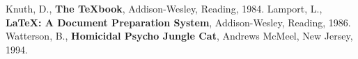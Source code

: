 \documentclass[12pt,A4]{article}
\begin{document}
	\begin{thebibliography}{}
	Knuth, D., \textbf{The \TeX book}, Addison-Wesley, Reading, 1984.
	Lamport, L., \textbf{\LaTeX: A Document Preparation System}, Addison-Wesley, Reading, 1986.
	Watterson, B., \textbf{Homicidal Psycho Jungle Cat}, Andrews McMeel, New Jersey, 1994.
	\end{thebibliography}
\end{document}
